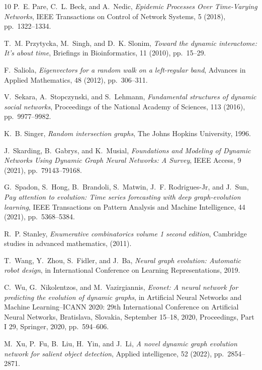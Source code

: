 \documentclass[11pt,a4paper]{article}
\begin{document}
\begin{thebibliography}{10}
{\sc P.~E. Pare, C.~L. Beck, and A.~Nedic}, {\em Epidemic {{Processes Over Time-Varying Networks}}}, IEEE Transactions on Control of Network Systems, 5 (2018), pp.~1322--1334.

{\sc T.~M. Przytycka, M.~Singh, and D.~K. Slonim}, {\em Toward the dynamic interactome: It's about time}, Briefings in Bioinformatics, 11 (2010), pp.~15--29.

{\sc F.~Saliola}, {\em Eigenvectors for a random walk on a left-regular band}, Advances in Applied Mathematics, 48 (2012), pp.~306--311.

{\sc V.~Sekara, A.~Stopczynski, and S.~Lehmann}, {\em Fundamental structures of dynamic social networks}, Proceedings of the National Academy of Sciences, 113 (2016), pp.~9977--9982.

{\sc K.~B. Singer}, {\em Random intersection graphs}, The Johns Hopkins University, 1996.

{\sc J.~Skarding, B.~Gabrys, and K.~Musial}, {\em Foundations and {{Modeling}} of {{Dynamic Networks Using Dynamic Graph Neural Networks}}: {{A Survey}}}, IEEE Access, 9 (2021), pp.~79143--79168.

{\sc G.~Spadon, S.~Hong, B.~Brandoli, S.~Matwin, J.~F. Rodrigues-Jr, and J.~Sun}, {\em Pay attention to evolution: Time series forecasting with deep graph-evolution learning}, IEEE Transactions on Pattern Analysis and Machine Intelligence, 44 (2021), pp.~5368--5384.

{\sc R.~P. Stanley}, {\em Enumerative combinatorics volume 1 second edition}, Cambridge studies in advanced mathematics,  (2011).

{\sc T.~Wang, Y.~Zhou, S.~Fidler, and J.~Ba}, {\em Neural graph evolution: Automatic robot design}, in International Conference on Learning Representations, 2019.

{\sc C.~Wu, G.~Nikolentzos, and M.~Vazirgiannis}, {\em Evonet: A neural network for predicting the evolution of dynamic graphs}, in Artificial Neural Networks and Machine Learning--ICANN 2020: 29th International Conference on Artificial Neural Networks, Bratislava, Slovakia, September 15--18, 2020, Proceedings, Part I 29, Springer, 2020, pp.~594--606.

{\sc M.~Xu, P.~Fu, B.~Liu, H.~Yin, and J.~Li}, {\em A novel dynamic graph evolution network for salient object detection}, Applied intelligence, 52 (2022), pp.~2854--2871.

\end{thebibliography}
\end{document}
